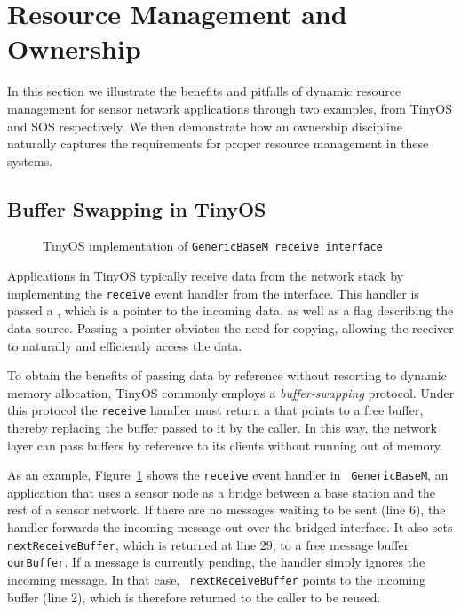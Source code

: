 \section{Resource Management and Ownership}
\label{sec:example}

In this section we illustrate the benefits and pitfalls of dynamic
resource management for sensor network applications through two
examples, from TinyOS and SOS respectively.  We then demonstrate how
an ownership discipline naturally captures the requirements for proper
resource management in these systems.

\subsection{Buffer Swapping in TinyOS}

\begin{figure}[t]

\caption{TinyOS implementation of {\tt GenericBaseM receive
interface}\label{fig:genericbase}}
\end{figure}

Applications in TinyOS typically receive data from the network stack
by implementing the {\tt receive} event handler from the
 interface.  This handler is passed a
, which is a pointer to the incoming data, as well
as a flag describing the data source.  Passing a pointer 
obviates the need for copying, 
allowing the receiver to naturally and efficiently access the data.

To obtain the benefits of passing data by reference without resorting
to dynamic memory allocation, TinyOS commonly
employs a {\em buffer-swapping} protocol.  Under this protocol the
{\tt receive} handler must return a  that points to
a free buffer, thereby replacing the buffer passed to it by the caller.
In this way, the network layer can pass buffers by reference to its
clients without running out of memory.

As an example, 
Figure~\ref{fig:genericbase} shows 
the {\tt receive} event handler in {\tt
GenericBaseM}, an application that uses a sensor node as a bridge
between a base station and the rest of a sensor network.  
If there are no messages waiting to be sent (line 6), the handler
forwards the incoming message out over the bridged interface.  It also sets
{\tt nextReceiveBuffer}, which is returned at line 29, to a free
message buffer {\tt ourBuffer}.  If a message is currently pending,
the handler simply ignores the incoming message.  In that case, {\tt
  nextReceiveBuffer} points to the incoming buffer (line 2), which
is therefore returned to the caller to be reused.

